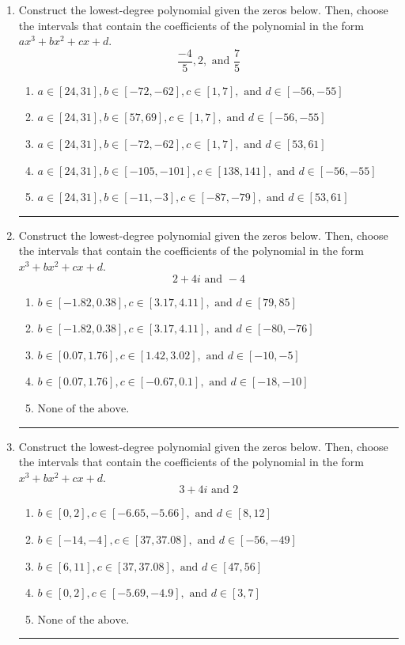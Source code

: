 \documentclass[14pt]{extbook}
\newcommand{\litem}[1]{\item#1\hspace*{-1cm}\rule{\textwidth}{0.4pt}}
\begin{document}
\begin{enumerate}
\litem{
Construct the lowest-degree polynomial given the zeros below. Then, choose the intervals that contain the coefficients of the polynomial in the form $ax^3+bx^2+cx+d$.\[ \frac{-4}{5}, 2, \text{ and } \frac{7}{5} \]\begin{enumerate}[label=\Alph*.]
\item \( a \in [24, 31], b \in [-72, -62], c \in [1, 7], \text{ and } d \in [-56, -55] \)
\item \( a \in [24, 31], b \in [57, 69], c \in [1, 7], \text{ and } d \in [-56, -55] \)
\item \( a \in [24, 31], b \in [-72, -62], c \in [1, 7], \text{ and } d \in [53, 61] \)
\item \( a \in [24, 31], b \in [-105, -101], c \in [138, 141], \text{ and } d \in [-56, -55] \)
\item \( a \in [24, 31], b \in [-11, -3], c \in [-87, -79], \text{ and } d \in [53, 61] \)

\end{enumerate} }
\litem{
Construct the lowest-degree polynomial given the zeros below. Then, choose the intervals that contain the coefficients of the polynomial in the form $x^3+bx^2+cx+d$.\[ 2 + 4 i \text{ and } -4 \]\begin{enumerate}[label=\Alph*.]
\item \( b \in [-1.82, 0.38], c \in [3.17, 4.11], \text{ and } d \in [79, 85] \)
\item \( b \in [-1.82, 0.38], c \in [3.17, 4.11], \text{ and } d \in [-80, -76] \)
\item \( b \in [0.07, 1.76], c \in [1.42, 3.02], \text{ and } d \in [-10, -5] \)
\item \( b \in [0.07, 1.76], c \in [-0.67, 0.1], \text{ and } d \in [-18, -10] \)
\item \( \text{None of the above.} \)

\end{enumerate} }
\litem{
Construct the lowest-degree polynomial given the zeros below. Then, choose the intervals that contain the coefficients of the polynomial in the form $x^3+bx^2+cx+d$.\[ 3 + 4 i \text{ and } 2 \]\begin{enumerate}[label=\Alph*.]
\item \( b \in [0, 2], c \in [-6.65, -5.66], \text{ and } d \in [8, 12] \)
\item \( b \in [-14, -4], c \in [37, 37.08], \text{ and } d \in [-56, -49] \)
\item \( b \in [6, 11], c \in [37, 37.08], \text{ and } d \in [47, 56] \)
\item \( b \in [0, 2], c \in [-5.69, -4.9], \text{ and } d \in [3, 7] \)
\item \( \text{None of the above.} \)


\end{enumerate}}
\end{enumerate}
\end{document}
